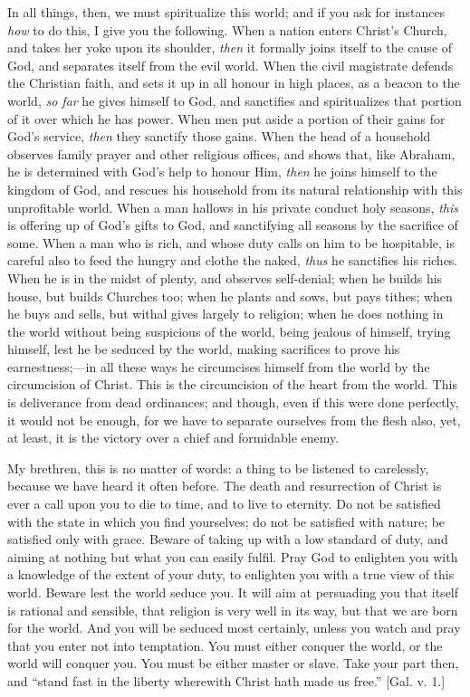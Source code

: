 In all things, then, we must spiritualize this world; and if you
ask for instances \emph{how} to do this, I give you the following.
When a nation enters Christ's Church, and takes her yoke upon its
shoulder, \emph{then} it formally joins itself to the cause of God,
and separates itself from the evil world. When the civil magistrate
defends the Christian faith, and sets it up in all honour in high
places, as a beacon to the world, \emph{so far} he gives himself to
God, and sanctifies and spiritualizes that portion of it over which he
has power. When men put aside a portion of their gains for God's
service, \emph{then} they sanctify those gains. When the head of a
household observes family prayer and other religious offices, and
shows that, like Abraham, he is determined with God's help to honour
Him, \emph{then} he joins himself to the kingdom of God, and rescues his
household from its natural relationship with this unprofitable world.
When a man hallows in his private conduct holy seasons, \emph{this} is
offering up of God's gifts to God, and sanctifying all seasons by the
sacrifice of some. When a man who is rich, and whose duty calls on him
to be hospitable, is careful also to feed the hungry and clothe the
naked, \emph{thus} he sanctifies his riches. When he is in the midst
of plenty, and observes self-denial; when he builds his house, but
builds Churches too; when he plants and sows, but pays tithes; when he
buys and sells, but withal gives largely to religion; when he does
nothing in the world without being suspicious of the world, being
jealous of himself, trying himself, lest he be seduced by the world,
making sacrifices to prove his earnestness;—in all these ways he
circumcises himself from the world by the circumcision of Christ. This
is the circumcision of the heart from the world. This is deliverance
from dead ordinances; and though, even if this were done perfectly, it
would not be enough, for we have to separate ourselves from the flesh
also, yet, at least, it is the victory over a chief and formidable
enemy.

My brethren, this is no matter of words: a thing to be listened to
carelessly, because we have heard it often before. The death and
resurrection of Christ is ever a call upon you to die to time, and to
live to eternity. Do not be satisfied with the state in which you find
yourselves; do not be satisfied with nature; be satisfied only with
grace. Beware of taking up with a low standard of duty, and aiming at
nothing but what you can easily fulfil. Pray God to enlighten you with
a knowledge of the extent of your duty, to enlighten you with a true
view of this world. Beware lest the world seduce you. It will aim at
persuading you that itself is rational and sensible, that religion is
very well in its way, but that we are born for the world. And you will
be seduced most certainly, unless you watch and pray that you enter
not into temptation. You must either conquer the world, or the world
will conquer you. You must be either master or slave. Take your part
then, and ``stand fast in the liberty wherewith Christ hath made
us free.'' [Gal. v. 1.]

